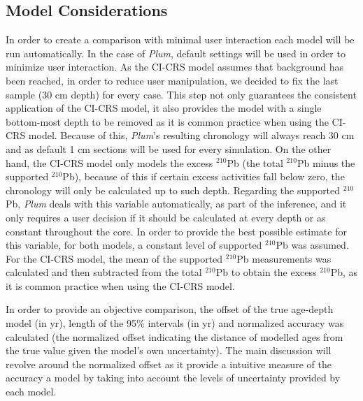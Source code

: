 \documentclass [10pt] {article}
\begin{document}
\subsection{Model Considerations}
In order to create a comparison with minimal user interaction each model will be run automatically.
In the case of \textit{Plum}, default settings will be used in order to minimize user interaction.
As the CI-CRS model assumes that background has been reached, in order to reduce user manipulation, we decided to fix the last sample (30 cm depth) for every case.
This step not only guarantees the consistent application of the CI-CRS model, it also provides the model with a single bottom-most depth to be removed as it is common practice when using the CI-CRS model.
Because of this, \textit{Plum}'s resulting chronology will always reach 30 cm and as default 1 cm sections will be used for every simulation.
On the other hand, the CI-CRS model only models the excess $^{210}$Pb (the total $^{210}$Pb minus the supported $^{210}$Pb), because of this if certain excess activities fall below zero, the chronology will only be calculated up to such depth.
Regarding the supported $^{210}$Pb, \textit{Plum} deals with this variable automatically, as part of the inference, and it only requires a user decision if it should be calculated at every depth or as constant throughout the core.
In order to provide the best possible estimate for this variable, for both models, a constant level of supported $^{210}$Pb was assumed.
For the CI-CRS model, the mean of the supported $^{210}$Pb measurements was calculated and then subtracted from the total $^{210}$Pb to obtain the excess $^{210}$Pb, as it is common practice when using the CI-CRS model.

In order to provide an objective comparison, the offset of the true age-depth model (in yr), length of the 95\% intervals (in yr) and normalized accuracy was calculated (the normalized offset indicating the distance of modelled ages from the true value given the model's own uncertainty). 
The main discussion will revolve around the normalized offset as it provide a intuitive measure of the accuracy a model by taking into account the levels of uncertainty provided by each model. 


\end{document}
